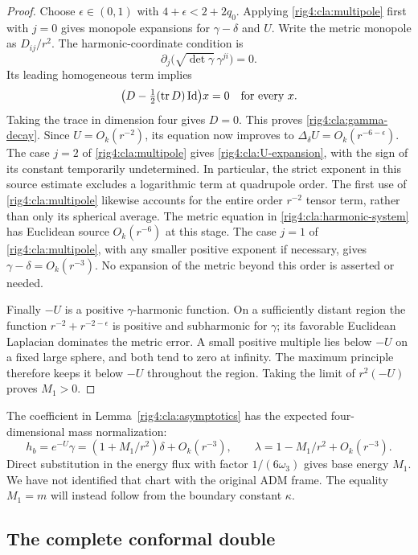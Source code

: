 \begin{proof}
Choose $\epsilon\in(0,1)$ with $4+\epsilon<2+2q_0$.
Applying \eqref{rig4:cla:multipole} first with $j=0$ gives monopole
expansions for $\gamma-\delta$ and $U$.  Write the metric monopole as
$D_{ij}/r^2$.  The harmonic-coordinate condition is
\[
 \partial_j\bigl(\sqrt{\det\gamma}\,\gamma^{ji}\bigr)=0.
\]
Its leading homogeneous term implies
\[
 \bigl(D-\tfrac12(\operatorname{tr} D)\operatorname{Id}\bigr)x=0
       \quad\hbox{for every }x.
\]
Taking the trace in dimension four gives $D=0$.
This proves \eqref{rig4:cla:gamma-decay}.  Since $U=O_k(r^{-2})$, its
equation now improves to
$\Delta_\delta U=O_k(r^{-6-\epsilon})$.
The case $j=2$ of \eqref{rig4:cla:multipole} gives
\eqref{rig4:cla:U-expansion}, with the sign of its constant temporarily
undetermined.  In particular, the strict exponent in this source
estimate excludes a logarithmic term at quadrupole order.  The first
use of \eqref{rig4:cla:multipole} likewise accounts for the entire order
$r^{-2}$ tensor term, rather than only its spherical average.
The metric equation in
\eqref{rig4:cla:harmonic-system} has Euclidean source $O_k(r^{-6})$ at this
stage.  The case $j=1$ of \eqref{rig4:cla:multipole}, with any smaller
positive exponent if necessary, gives
$\gamma-\delta=O_k(r^{-3})$.
No expansion of the metric beyond this order is asserted or needed.

Finally $-U$ is a positive $\gamma$-harmonic function.
On a sufficiently distant region the function
$r^{-2}+r^{-2-\epsilon}$ is positive and subharmonic for $\gamma$;
its favorable Euclidean Laplacian dominates the metric error.
A small positive multiple lies below $-U$ on a fixed large sphere,
and both tend to zero at infinity.  The maximum principle therefore
keeps it below $-U$ throughout the region.  Taking the limit of
$r^2(-U)$ proves $M_1>0$.
\end{proof}

\begin{remark}\label{rig4:cla:base-mass}
The coefficient in Lemma~\ref{rig4:cla:asymptotics} has the expected
four-dimensional mass normalization:
\[
 h_b=e^{-U}\gamma
       =(1+M_1/r^2)\delta+O_k(r^{-3}),\qquad
 \lambda=1-M_1/r^2+O_k(r^{-3}).
\]
Direct substitution in the energy flux with factor $1/(6\omega_3)$
gives base energy $M_1$.  We have not identified that chart with the
original ADM frame.  The equality $M_1=m$ will instead follow from
the boundary constant $\kappa$.
\end{remark}

\subsection{The complete conformal double}

